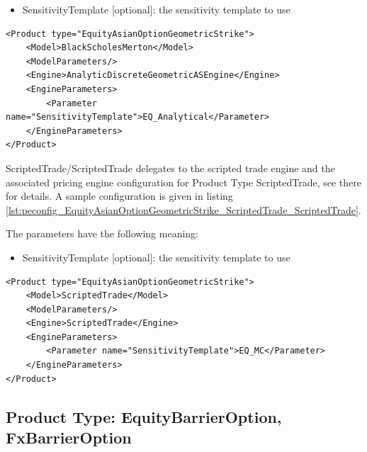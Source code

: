 \begin{itemize}
\item SensitivityTemplate [optional]: the sensitivity template to use
\end{itemize}

\begin{longlisting}
\begin{verbatim}
<Product type="EquityAsianOptionGeometricStrike">
    <Model>BlackScholesMerton</Model>
    <ModelParameters/>
    <Engine>AnalyticDiscreteGeometricASEngine</Engine>
    <EngineParameters>
        <Parameter name="SensitivityTemplate">EQ_Analytical</Parameter>
    </EngineParameters>
</Product>
\end{verbatim}
\caption{Configuration for Product EquityAsianOptionGeometricStrike, Model BlackScholesMerton, Engine AnalyticDiscreteGeomtetricASEngine}
\label{lst:peconfig_EquityAsianOptionGeometricStrike_BlackScholesMerton_AnalyticDiscreteGeomtetricASEngine}
\end{longlisting}

ScriptedTrade/ScriptedTrade delegates to the scripted trade engine and the associated pricing engine configuration for
Product Type ScriptedTrade, see there for details. A sample configuration is given in listing
\ref{lst:peconfig_EquityAsianOptionGeometricStrike_ScriptedTrade_ScriptedTrade}.

The parameters have the following meaning:

\begin{itemize}
\item SensitivityTemplate [optional]: the sensitivity template to use
\end{itemize}

\begin{longlisting}
\begin{verbatim}
<Product type="EquityAsianOptionGeometricStrike">
    <Model>ScriptedTrade</Model>
    <ModelParameters/>
    <Engine>ScriptedTrade</Engine>
    <EngineParameters>
        <Parameter name="SensitivityTemplate">EQ_MC</Parameter>
    </EngineParameters>
</Product>
\end{verbatim}
\caption{Configuration for Product EquityAsianOptionGeometricStrike, Model ScriptedTrade, Engine ScriptedTrade}
\label{lst:peconfig_EquityAsianOptionGeometricStrike_ScriptedTrade_ScriptedTrade}
\end{longlisting}

\subsection{Product Type: EquityBarrierOption, FxBarrierOption}

